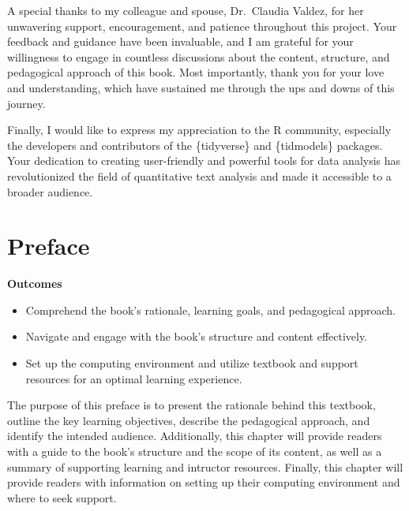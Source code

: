 \documentclass[
  letterpaper,
  krantz1]{latex/krantz-mod}
\providecommand{\tightlist}{%
  \setlength{\itemsep}{0pt}\setlength{\parskip}{0pt}}\usepackage{longtable,booktabs,array}
\newcommand{\setDOI}[1]{\gdef\doi{#1}}
\theoremstyle{definition}
\theoremstyle{definition}
\theoremstyle{remark}
\begin{document}
A special thanks to my colleague and spouse, Dr.~Claudia Valdez, for her
unwavering support, encouragement, and patience throughout this project.
Your feedback and guidance have been invaluable, and I am grateful for
your willingness to engage in countless discussions about the content,
structure, and pedagogical approach of this book. Most importantly,
thank you for your love and understanding, which have sustained me
through the ups and downs of this journey.

Finally, I would like to express my appreciation to the R community,
especially the developers and contributors of the \{tidyverse\} and
\{tidmodels\} packages. Your dedication to creating user-friendly and
powerful tools for data analysis has revolutionized the field of
quantitative text analysis and made it accessible to a broader audience.


\chapter*{Preface}\label{sec-preface}


\setDOI{10.4324/9781003393764.0}
\thispagestyle{chapterfirstpage}

\begin{tcolorbox}[enhanced jigsaw, leftrule=.75mm, colframe=quarto-callout-color-frame, left=2mm, colback=white, toprule=.15mm, breakable, arc=.35mm, opacityback=0, bottomrule=.15mm, rightrule=.15mm]

\textbf{ Outcomes}

\begin{itemize}
\tightlist
\item
  Comprehend the book's rationale, learning goals, and pedagogical
  approach.
\item
  Navigate and engage with the book's structure and content effectively.
\item
  Set up the computing environment and utilize textbook and support
  resources for an optimal learning experience.
\end{itemize}

\end{tcolorbox}

The purpose of this preface is to present the rationale behind this
textbook, outline the key learning objectives, describe the pedagogical
approach, and identify the intended audience. Additionally, this chapter
will provide readers with a guide to the book's structure and the scope
of its content, as well as a summary of supporting learning and
intructor resources. Finally, this chapter will provide readers with
information on setting up their computing environment and where to seek
support.
\end{document}
